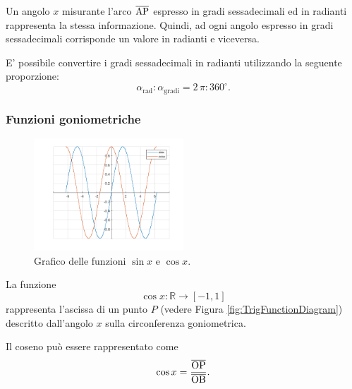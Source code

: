 \begin{remark}
    Un angolo $x$ misurante l'arco $\overline{\rm AP}$ espresso in gradi sessadecimali ed in radianti rappresenta la stessa informazione. Quindi, ad ogni angolo espresso in gradi sessadecimali corrisponde un valore in radianti e viceversa.
\end{remark}

\begin{property}
    E' possibile convertire i gradi sessadecimali in radianti utilizzando la seguente proporzione:
    \begin{equation*}
        \alpha_{\text{rad}}\colon\alpha_{\text{gradi}}=2\,\pi\colon 360^\circ.
    \end{equation*}
\end{property}

\subsubsection{Funzioni goniometriche}
\begin{figure}
    \centering
    \includegraphics[width=0.5\textwidth]{Analisi1/figures/sincosx.png}
    \caption{Grafico delle funzioni $\sin x$ e $\cos x$.}
    \label{fig:sincosx}
\end{figure}

\begin{definition}[Coseno]
    La funzione
    \begin{equation*}
        \cos x\colon \mathbb R\rightarrow[-1,1]
    \end{equation*}
    rappresenta l'\gls{ascissa} di un punto $P$ (vedere Figura \ref{fig:TrigFunctionDiagram}) descritto dall'angolo $x$ sulla circonferenza goniometrica.
\end{definition}

\begin{proposition}
    Il coseno può essere rappresentato come
    \begin{equation*}
        \cos x=\frac{\overline{\rm OP}}{\overline{\rm OB}}.
    \end{equation*}
\end{proposition}

